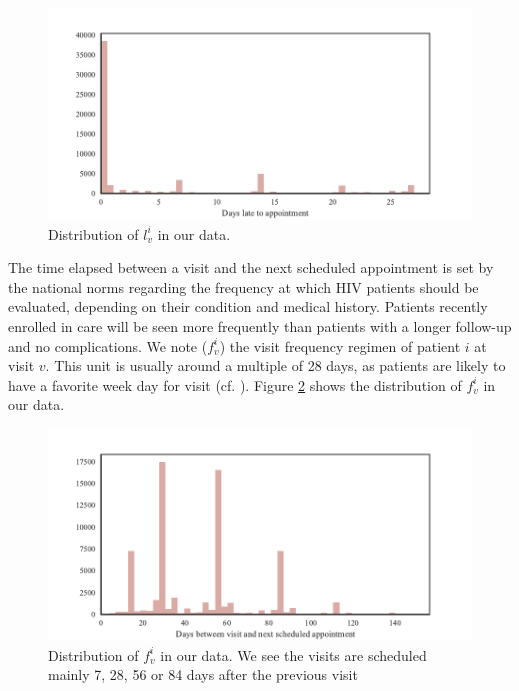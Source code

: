 \begin{center}
\begin{figure}[ht]
\includegraphics[width=\textwidth]{figure/time_late_to_appointment.pdf}
\caption{Distribution of $l_v^i$ in our data.}
\label{fig:late_days}
\end{figure}
\end{center}

The time elapsed between a visit and the next scheduled appointment is set by the national norms regarding the frequency at which HIV patients should be evaluated, depending on their condition and medical history. Patients recently enrolled in care will be seen more frequently than patients with a longer follow-up and no complications. We note ($f_v^i$) the visit frequency regimen of patient $i$ at visit $v$. This unit is usually around a multiple of 28 days, as patients are likely to have a favorite week day for visit (cf. ). Figure \ref{fig:schedule_days} shows the distribution of $f_v^i$ in our data.

\begin{center}
\begin{figure}[ht]
\includegraphics[width=\textwidth]{figure/time_to_appointment.pdf}
\caption{Distribution of $f_v^i$ in our data. We see the visits are scheduled mainly 7, 28, 56 or 84 days after the previous visit}
\label{fig:schedule_days}
\end{figure}
\end{center}

